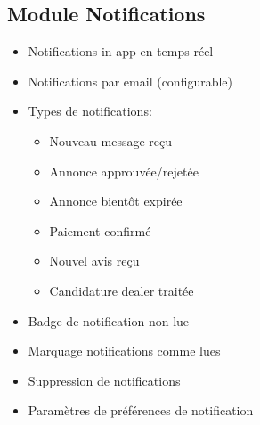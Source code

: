 \documentclass[12pt,a4paper]{report}
\begin{document}
\subsection{Module Notifications}
\begin{itemize}
    \item Notifications in-app en temps réel
    \item Notifications par email (configurable)
    \item Types de notifications:
    \begin{itemize}
        \item Nouveau message reçu
        \item Annonce approuvée/rejetée
        \item Annonce bientôt expirée
        \item Paiement confirmé
        \item Nouvel avis reçu
        \item Candidature dealer traitée
    \end{itemize}
    \item Badge de notification non lue
    \item Marquage notifications comme lues
    \item Suppression de notifications
    \item Paramètres de préférences de notification
\end{itemize}

\end{document}
